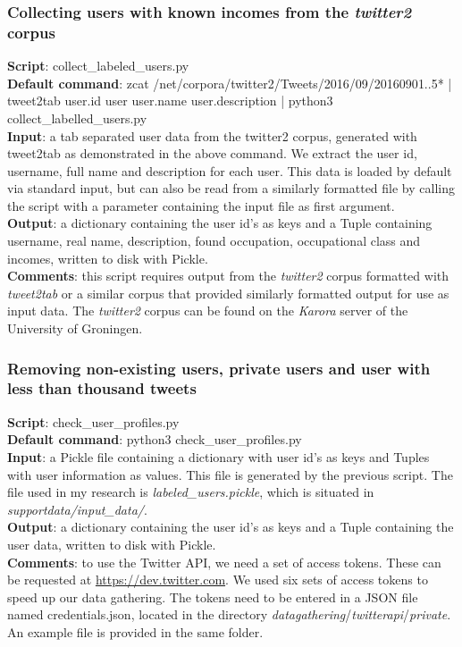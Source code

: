 \documentclass[
10pt, %
a4paper, %
oneside, %
headinclude,footinclude, %
] {book}%
\begin{document}
\subsubsection{Collecting users with known incomes from the \textit{twitter2} corpus}
\textbf{Script}:	collect\_labeled\_users.py \\
\textbf{Default command}: zcat /net/corpora/twitter2/Tweets/2016/09/2016090{1..5}* | tweet2tab user.id user user.name user.description | python3 collect\_labelled\_users.py\\
\textbf{Input}: a tab separated user data from the twitter2 corpus, generated with tweet2tab as demonstrated in the above command. We extract the user id, username, full name and description for each user. This data is loaded by default via standard input, but can also be read from a similarly formatted file by calling the script with a parameter containing the input file as first argument. \\
\textbf{Output}: a dictionary containing the user id's as keys and a Tuple containing username, real name,
     description, found occupation, occupational class and incomes, written to disk with Pickle.\\
\textbf{Comments}: this script requires output from the \textit{twitter2} corpus formatted with \textit{tweet2tab} or a similar corpus that provided similarly formatted output for use as input data. The \textit{twitter2} corpus can be found on the \textit{Karora} server of the University of Groningen. 

\subsubsection{Removing non-existing users, private users and user with less than thousand tweets}
\textbf{Script}:	check\_user\_profiles.py \\
\textbf{Default command}: python3 check\_user\_profiles.py \\
\textbf{Input}: a Pickle file containing a dictionary with user id's as keys and Tuples with user information as values. This file is generated by the previous script. The file used in my research is \textit{labeled\_users.pickle}, which is situated in  \textit{supportdata/input\_data/}.  \\
\textbf{Output}:  a dictionary containing the user id's as keys and a Tuple containing the user data, written to disk with Pickle. \\
\textbf{Comments}: to use the Twitter API, we need a set of access tokens. These can be requested at \url{https://dev.twitter.com}. We used six sets of access tokens to speed up our data gathering. The tokens need to be entered in a JSON file named credentials.json, located in the directory \textit{datagathering}/\textit{twitterapi}/\textit{private}. An example file is provided in the same folder.
\end{document}
